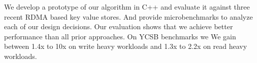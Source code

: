


We develop a prototype of our algorithm in C++ and evaluate
it against three recent RDMA based key value stores. And
provide microbenchmarks to analyze each of our design
decisions. Our evaluation shows that we achieve better
performance than all prior approaches. On YCSB benchmarks we
We gain between 1.4x to 10x on write heavy workloads and
1.3x to 2.2x on read heavy workloads. 
